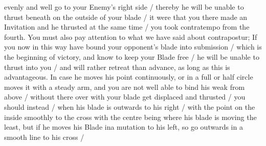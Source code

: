\newpage


\newpage


evenly and well go to your Enemy's right side / thereby he will be
unable to thrust beneath on the outside of your blade / it were that
you there made an Invitation and he thrusted at the same time / you took
contratempo from the fourth. You must also pay attention to what we
have said about contrapostur; If you now in this way have bound your
opponent's blade into submission / which is the beginning of victory,
and know to keep your Blade free / he will be unable to thrust into you
/ and will rather retreat than advance, as long as this is
advantageous. In case he moves his point continuously, or in a full or
half circle moves it with a steady arm,
and you are not well able to bind his weak from above / without there
over with your blade get displaced and thrusted / you should instead /
when his blade is outwards to his right / with the point on the inside
smoothly to the cross with the centre being where his blade is moving
the least, but if he moves his Blade ina mutation to his left, so go
outwards in a smooth line to his cross / 
